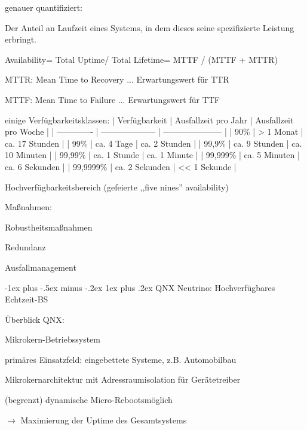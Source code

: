 \documentclass[a4paper]{article}
\makeatletter
\renewcommand{\subsubsection}{\@startsection{subsubsection}{3}{0mm}%
 {-1ex plus -.5ex minus -.2ex}%
 {1ex plus .2ex}%
 {\normalfont\small\bfseries}}
\makeatother
\begin{document}
\begin{multicols}{3}
    genauer quantifiziert:

    \begin{itemize*}
        \item
        Der Anteil an Laufzeit eines Systems, in dem dieses seine
        spezifizierte Leistung erbringt.
        \item
        Availability= Total Uptime/ Total Lifetime= MTTF / (MTTF + MTTR)
        \begin{itemize*}
            \item MTTR: Mean Time to Recovery ... Erwartungswert für TTR
            \item MTTF: Mean Time to Failure ... Erwartungswert für TTF
        \end{itemize*}
        \item
        einige Verfügbarkeitsklassen: | Verfügbarkeit |
        Ausfallzeit pro Jahr | Ausfallzeit pro Woche |
        | ------------- |
        -------------------- |
        ---------------------
        | | 90\% | \textgreater{} 1 Monat
        | ca. 17 Stunden | | 99\% | ca. 4
        Tage | ca. 2 Stunden | | 99,9\% |
        ca. 9 Stunden | ca. 10 Minuten | | 99,99\%
        | ca. 1 Stunde | ca. 1 Minute | |
        99,999\% | ca. 5 Minuten | ca. 6 Sekunden |
        | 99,9999\% | ca. 2 Sekunden |
        \textless\textless{} 1 Sekunde |
        \item
        Hochverfügbarkeitsbereich (gefeierte ,,five nines'' availability)
        \item
        Maßnahmen:
        \item
        Robustheitsmaßnahmen
        \item
        Redundanz
        \item
        Ausfallmanagement
    \end{itemize*}


    \subsubsection{QNX Neutrino: Hochverfügbares
        Echtzeit-BS}

    Überblick QNX:

    \begin{itemize*}
        \item
        Mikrokern-Betriebssystem
        \item
        primäres Einsatzfeld: eingebettete Systeme, z.B. Automobilbau
        \item
        Mikrokernarchitektur mit Adressraumisolation für Gerätetreiber
        \item
        (begrenzt) dynamische Micro-Rebootsmöglich
        \item
        $\rightarrow$ Maximierung der Uptime des Gesamtsystems
    \end{itemize*}


\end{multicols}
\end{document}

